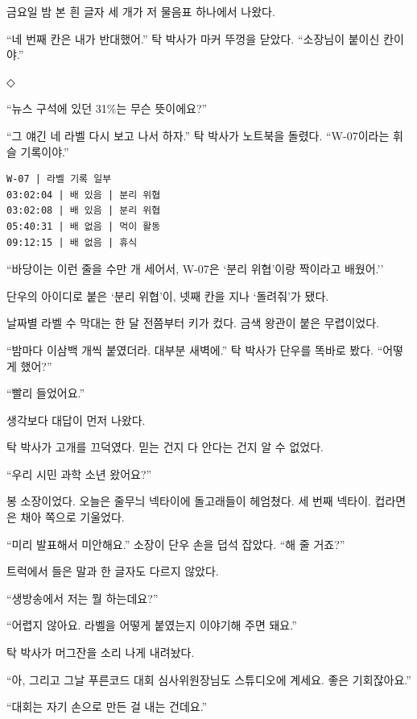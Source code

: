 \documentclass[
  korean,
  letterpaper,
  twoside,
  open=any,
  fontsize=12.5pt,
  headings=small]{scrbook}
\newcommand{\logfont}{\linespread{1}\fontsize{10.8}{15.2}\selectfont}
\begin{document}
금요일 밤 본 흰 글자 세 개가
저 물음표 하나에서 나왔다.

``네 번째 칸은 내가
반대했어.'' 탁 박사가 마커
뚜껑을 닫았다. ``소장님이
붙이신 칸이야.''

\begin{center}◇\end{center}\nopagebreak

``뉴스 구석에 있던 31\%는 무슨
뜻이에요?''

``그 얘긴 네 라벨 다시 보고
나서 하자.'' 탁 박사가
노트북을 돌렸다. ``W-07이라는
휘슬 기록이야.''

\begin{Verbatim}[samepage=true,frame=single,framesep=2.5mm,rulecolor=\color{gray},formatcom=\logfont]
W-07 | 라벨 기록 일부
03:02:04 | 배 있음 | 분리 위협
03:02:08 | 배 있음 | 분리 위협
05:40:31 | 배 없음 | 먹이 활동
09:12:15 | 배 없음 | 휴식
\end{Verbatim}

``바당이는 이런 줄을 수만 개
세어서, W-07은 `분리 위협'이랑
짝이라고 배웠어.''

단우의 아이디로 붙은 `분리
위협'이, 넷째 칸을 지나
`돌려줘'가 됐다.

날짜별 라벨 수 막대는 한 달
전쯤부터 키가 컸다. 금색
왕관이 붙은 무렵이었다.

``밤마다 이삼백 개씩 붙였더라.
대부분 새벽에.'' 탁 박사가
단우를 똑바로 봤다. ``어떻게
했어?''

``빨리 들었어요.''

생각보다 대답이 먼저 나왔다.

탁 박사가 고개를 끄덕였다.
믿는 건지 다 안다는 건지 알 수
없었다.

``우리 시민 과학 소년
왔어요?''

봉 소장이었다. 오늘은 줄무늬
넥타이에 돌고래들이 헤엄쳤다.
세 번째 넥타이. 컵라면은 채아
쪽으로 기울었다.

``미리 발표해서 미안해요.''
소장이 단우 손을 덥석 잡았다.
``해 줄 거죠?''

트럭에서 들은 말과 한 글자도
다르지 않았다.

``생방송에서 저는 뭘
하는데요?''

``어렵지 않아요. 라벨을 어떻게
붙였는지 이야기해 주면 돼요.''

탁 박사가 머그잔을 소리 나게
내려놨다.

``아, 그리고 그날 푸른코드
대회 심사위원장님도 스튜디오에
계세요. 좋은 기회잖아요.''

``대회는 자기 손으로 만든 걸
내는 건데요.''
\end{document}
